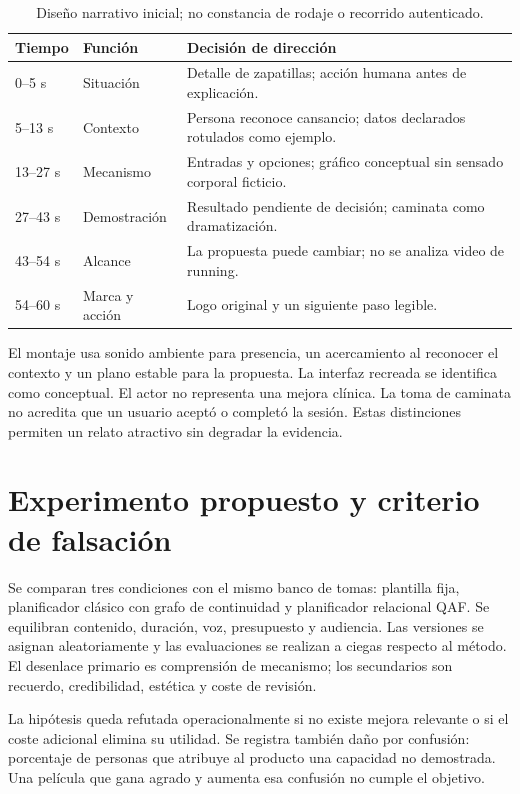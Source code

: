 \begin{table}[ht]\centering\compacttable
\begin{tabular}{p{.12\linewidth}p{.25\linewidth}p{.50\linewidth}}\toprule
Tiempo & Función & Decisión de dirección \\\midrule
0--5 s & Situación & Detalle de zapatillas; acción humana antes de explicación.\\
5--13 s & Contexto & Persona reconoce cansancio; datos declarados rotulados como ejemplo.\\
13--27 s & Mecanismo & Entradas y opciones; gráfico conceptual sin sensado corporal ficticio.\\
27--43 s & Demostración & Resultado pendiente de decisión; caminata como dramatización.\\
43--54 s & Alcance & La propuesta puede cambiar; no se analiza video de running.\\
54--60 s & Marca y acción & Logo original y un siguiente paso legible.\\\bottomrule
\end{tabular}\caption{Diseño narrativo inicial; no constancia de rodaje o recorrido autenticado.}
\end{table}

El montaje usa sonido ambiente para presencia, un acercamiento al reconocer el contexto y un plano estable para la propuesta. La interfaz recreada se identifica como conceptual. El actor no representa una mejora clínica. La toma de caminata no acredita que un usuario aceptó o completó la sesión. Estas distinciones permiten un relato atractivo sin degradar la evidencia.

\section{Experimento propuesto y criterio de falsación}
Se comparan tres condiciones con el mismo banco de tomas: plantilla fija, planificador clásico con grafo de continuidad y planificador relacional QAF. Se equilibran contenido, duración, voz, presupuesto y audiencia. Las versiones se asignan aleatoriamente y las evaluaciones se realizan a ciegas respecto al método. El desenlace primario es comprensión de mecanismo; los secundarios son recuerdo, credibilidad, estética y coste de revisión.

La hipótesis queda refutada operacionalmente si no existe mejora relevante o si el coste adicional elimina su utilidad. Se registra también daño por confusión: porcentaje de personas que atribuye al producto una capacidad no demostrada. Una película que gana agrado y aumenta esa confusión no cumple el objetivo.

